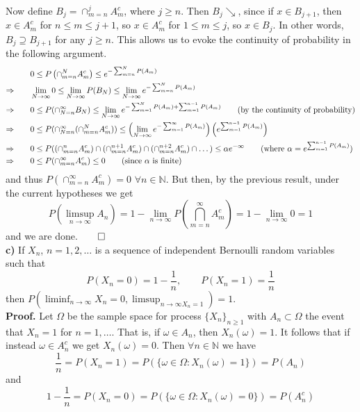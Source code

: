 \documentclass[11pt, letterpaper]{article}
\newcommand{\mbb}[1]{\mathbb{#1}}
\begin{document}
    Now define $B_j=\cap_{m=n}^j A_m^c$, where $j\geq n$. Then $B_j\searrow$, since if $x\in B_{j+1}$, then $x\in A_m^c$ for $n\leq m\leq j+1$, so $x\in A_m^c$ for $1\leq m\leq j$, so $x\in B_j$.
    In other words, $B_j\supseteq B_{j+1}$ for any $j\geq n$. This allows us to evoke the continuity of probability in the following argument.
    \begin{align*}
        &0\leq P\left(\cap_{m=n}^N A_m^c\right)\leq e^{-\sum_{m=n}^NP(A_m)}\\
        \Rightarrow\qquad&\lim_{N\rightarrow\infty}0\leq\lim_{N\rightarrow\infty}P(B_N)\leq\lim_{N\rightarrow\infty}e^{-\sum_{m=n}^NP(A_m)}\\
        \Rightarrow\qquad&0\leq P(\cap_{N=n}^\infty B_N)\leq \lim_{N\rightarrow\infty}e^{-\sum_{m=1}^NP(A_m)+\sum_{m=1}^{n-1}P(A_m)}\tag{by the continuity of probability}\\
        \Rightarrow\qquad&0\leq P(\cap_{N=n}^\infty (\cap_{m=n}^NA_m^c))\leq\left(\lim_{N\rightarrow\infty}e^{-\sum_{m=1}^\infty P(A_m)}\right)\left(e^{\sum_{m=1}^{n-1}P(A_m)}\right)\\
        \Rightarrow\qquad&0\leq P((\cap_{m=n}^n A_m^c)\cap(\cap_{m=n}^{n+1}A_m^c)\cap(\cap_{m=n}^{n+2}A_m^c)\cap\dots)\leq \alpha e^{-\infty}\tag{where $\alpha=e^{\sum_{m=1}^{n-1}P(A_m)}$}\\
        \Rightarrow\qquad&0\leq P(\cap_{m=n}^\infty A_m^c)\leq 0\tag{since $\alpha$ is finite}
    \end{align*}
    and thus $P(\cap_{m=n}^\infty A_m^c)=0$ $\forall n\in\mbb{N}$. But then, by the previous result, under the current hypotheses we get
    \[P\left(\limsup_{n\rightarrow\infty}A_n\right)=1-\lim_{n\rightarrow\infty}P\left(\bigcap_{m=n}^\infty A_m^c\right)=1-\lim_{n\rightarrow\infty}0=1\]
    and we are done.\hfill{$\qed$}\\[10pt]
    {\bf c)} If $X_n$, $n=1,2,\dots$ is a sequence of independent Bernoulli random variables such that
    \[P(X_n=0)=1-\frac{1}{n},\qquad P(X_n=1)=\frac{1}{n}\]
    then $P(\liminf_{n\rightarrow\infty}X_n=0,\limsup_{n\rightarrow\infty X_n=1})=1$.\\[10pt]
    {\bf Proof.} Let $\Omega$ be the sample space for process $\{X_n\}_{n\geq 1}$ with $A_n\subset\Omega$ the event that $X_n=1$ for $n=1,\dots$. That is,
    if $\omega\in A_n$, then $X_n(\omega)=1$. It follows that if instead $\omega\in A_n^c$ we get $X_n(\omega)=0$. Then $\forall n\in\mbb{N}$ we have
    \[\frac{1}{n}=P(X_n=1)=P(\{\omega\in\Omega:X_n(\omega)=1\})=P(A_n)\]
    and
    \[1-\frac{1}{n}=P(X_n=0)=P(\{\omega\in\Omega: X_n(\omega)=0\})=P(A_n^c)\]
\end{document}
